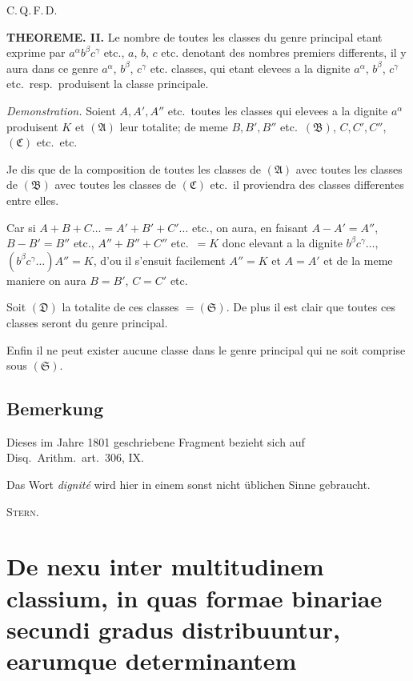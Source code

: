 \documentclass[12pt,a4paper]{article}
\begin{document}
C.\,Q.\,F.\,D.

\textbf{THEOREME. II.} Le nombre de toutes les classes du genre principal etant exprime par $a^\alpha b^\beta c^\gamma$ etc., $a$, $b$, $c$ etc. denotant des nombres premiers differents, il y aura dans ce genre $a^\alpha$, $b^\beta$, $c^\gamma$ etc. classes, qui etant elevees a la dignite $a^\alpha$, $b^\beta$, $c^\gamma$ etc.\ resp.\ produisent la classe principale.

\textit{Demonstration.} Soient $A, A', A''$ etc.\ toutes les classes qui elevees a la dignite $a^\alpha$ produisent $K$ et $(\mathfrak{A})$ leur totalite; de meme $B, B', B''$ etc.\ $(\mathfrak{B})$, $C, C', C''$, $(\mathfrak{C})$ etc.\ etc.

Je dis que de la composition de toutes les classes de $(\mathfrak{A})$ avec toutes les classes de $(\mathfrak{B})$ avec toutes les classes de $(\mathfrak{C})$ etc.\ il proviendra des classes differentes entre elles.

Car si $A+B+C\ldots=A'+B'+C'\ldots$ etc., on aura, en faisant $A-A'=A''$, $B-B'=B''$ etc., $A''+B''+C''$ etc.\ $=K$ donc elevant a la dignite $b^\beta c^\gamma\ldots$, $(b^\beta c^\gamma\ldots)A''=K$, d'ou il s'ensuit facilement $A''=K$ et $A=A'$ et de la meme maniere on aura $B=B'$, $C=C'$ etc.

Soit $(\mathfrak{D})$ la totalite de ces classes $= (\mathfrak{S})$. De plus il est clair que toutes ces classes seront du genre principal.

Enfin il ne peut exister aucune classe dans le genre principal qui ne soit comprise sous $(\mathfrak{S})$.

\subsection*{Bemerkung}

Dieses im Jahre 1801 geschriebene Fragment bezieht sich auf Disq.\ Arithm.\ art.\ 306, IX.

Das Wort \textit{dignit\'e} wird hier in einem sonst nicht \"ublichen Sinne gebraucht.

\begin{flushright}
\textsc{Stern.}
\end{flushright}


\section*{De nexu inter multitudinem classium, in quas formae binariae secundi gradus distribuuntur, earumque determinantem}
\end{document}
